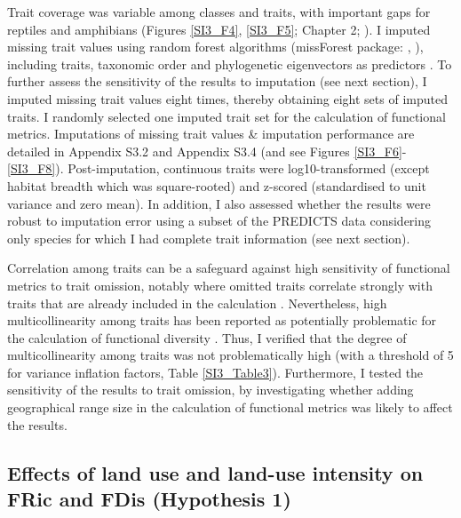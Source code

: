 Trait coverage was variable among classes and traits, with important gaps for reptiles and amphibians (Figures \ref{SI3_F4}, \ref{SI3_F5}; Chapter 2; \citet{Etard2020}). I imputed missing trait values using random forest algorithms (missForest package: \citet{Stekhoven2012}, \citet{Stekhoven2016}), including traits, taxonomic order and phylogenetic eigenvectors as predictors \citep{Debastiani2021, Penone2014}. To further assess the sensitivity of the results to imputation (see next section), I imputed missing trait values eight times, thereby obtaining eight sets of imputed traits. I randomly selected one imputed trait set for the calculation of functional metrics. Imputations of missing trait values \& imputation performance are detailed in Appendix S3.2 and Appendix S3.4 (and see Figures \ref{SI3_F6}-\ref{SI3_F8}). Post-imputation, continuous traits were log10-transformed (except habitat breadth which was square-rooted) and z-scored (standardised to unit variance and zero mean). In addition, I also assessed whether the results were robust to imputation error using a subset of the PREDICTS data considering only species for which I had complete trait information (see next section).

Correlation among traits can be a safeguard against high sensitivity of functional metrics to trait omission, notably where omitted traits correlate strongly with traits that are already included in the calculation \citep{Mouillot2021}. Nevertheless, high multicollinearity among traits has been reported as potentially problematic for the calculation of functional diversity \citep{Cadotte2011}. Thus, I verified that the degree of multicollinearity among traits was not problematically high (with a threshold of 5 for variance inflation factors, Table \ref{SI3_Table3}). Furthermore, I tested the sensitivity of the results to trait omission, by investigating whether adding geographical range size in the calculation of functional metrics was likely to affect the results.


\subsection{Effects of land use and land-use intensity on FRic and FDis (Hypothesis 1)}

